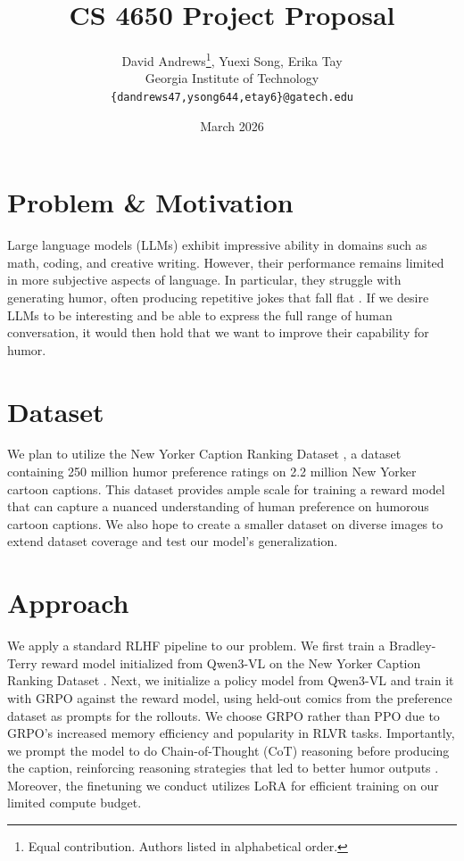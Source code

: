 \documentclass{article}
\title{CS 4650 Project Proposal}
\author{
David Andrews\thanks{Equal contribution. Authors listed in alphabetical order.}, 
\space Yuexi Song\footnotemark[1], 
 \space Erika Tay\footnotemark[1] \\
Georgia Institute of Technology \\
\texttt{\{dandrews47,ysong644,etay6\}@gatech.edu}
}
\date{March 2026}
\begin{document}
\maketitle
\vspace{-2em}
\section{Problem \& Motivation}
\vspace{-0.5em}
Large language models (LLMs) exhibit impressive ability in domains such as math, coding, and creative writing. However, their performance remains limited in more subjective aspects of language. In particular, they struggle with generating humor, often producing repetitive jokes that fall flat \cite{zhang2024humoraimassivescale,jentzsch2023chatgptfunfunnyhumor}. If we desire LLMs to be interesting and be able to express the full range of human conversation, it would then hold that we want to improve their capability for humor.
\vspace{-0.5em}
\section{Dataset}
\vspace{-0.5em}
We plan to utilize the New Yorker Caption Ranking Dataset \cite{zhang2024humoraimassivescale}, a dataset containing 250 million humor preference ratings on 2.2 million New Yorker cartoon captions. This dataset provides ample scale for training a reward model that can capture a nuanced understanding of human preference on humorous cartoon captions. We also hope to create a smaller dataset on diverse images to extend dataset coverage and test our model's generalization. 
\vspace{-0.5em}
\section{Approach}
\vspace{-0.5em}
We apply a standard RLHF \cite{ouyang2022traininglanguagemodelsfollow} pipeline to our problem. We first train a Bradley-Terry reward model \cite{christiano2023deepreinforcementlearninghuman} initialized from Qwen3-VL \cite{bai2025qwen3vltechnicalreport} on the New Yorker Caption Ranking Dataset \cite{zhang2024humoraimassivescale}. Next, we initialize a policy model from Qwen3-VL and train it with GRPO \cite{shao2024deepseekmathpushinglimitsmathematical} against the reward model, using held-out comics from the preference dataset as prompts for the rollouts. We choose GRPO rather than PPO due to GRPO's increased memory efficiency and popularity in RLVR tasks. Importantly, we prompt the model to do Chain-of-Thought (CoT) reasoning before producing the caption, reinforcing reasoning strategies that led to better humor outputs \cite{Guo_2025}. Moreover, the finetuning we conduct utilizes LoRA \cite{hu2021loralowrankadaptationlarge} for efficient training on our limited compute budget.
\end{document}
